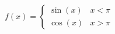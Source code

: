 {$f(x) = \left\{\begin{array}{cc} \sin{(x)} & x < \pi \\ \cos{(x)} & x> \pi \end{array}\right.$}
{\text{}\\ \label{fig:01_05_ex_10}}
